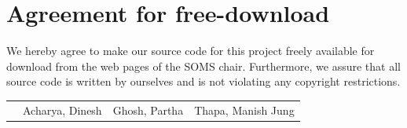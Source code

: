 \documentclass[11pt]{article}
\begin{document}

\newpage


\newpage
\section*{Agreement for free-download}
\bigskip


\bigskip

\large We hereby agree to make our source code for this project freely available for download from the web pages of the SOMS chair. Furthermore, we assure that all source code is written by ourselves and is not violating any copyright restrictions.

\begin{center}

\bigskip


\bigskip


\begin{tabular}{@{}p{1cm}@{}p{5cm}@{}@{}p{5cm}@{}@{}p{5cm}}
\begin{minipage}{3cm}

\end{minipage}
&
\begin{minipage}{6cm}
\vspace{2mm} \large Acharya, Dinesh

 \vspace{\baselineskip}

\end{minipage}
&
\begin{minipage}{6cm}

\large Ghosh, Partha

\end{minipage}
&
\begin{minipage}{6cm}

\large Thapa, Manish Jung

\end{minipage}
\end{tabular}


\end{center}
\newpage




\end{document}
